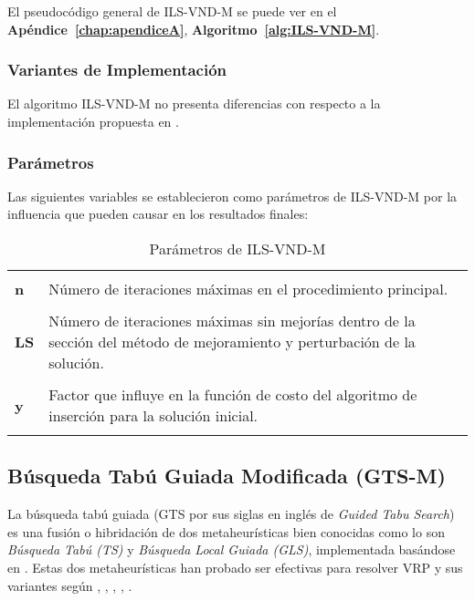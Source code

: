 El pseudocódigo general de ILS-VND-M se puede ver en el \textbf{Apéndice~\ref{chap:apendiceA}}, \textbf{Algoritmo~\ref{alg:ILS-VND-M}}.

\subsubsection*{Variantes de Implementación}

El algoritmo ILS-VND-M no presenta diferencias con respecto a la implementación propuesta en  \cite{ils-vnd}.

\subsubsection*{Parámetros}

Las siguientes variables se establecieron como parámetros de ILS-VND-M por la influencia que pueden causar en los resultados finales:


\begin{table}[ht]
\centering
\small
\caption{Parámetros de ILS-VND-M}
\begin{tabular}{l||p{15cm}}
\hline\hline\\
\textbf{n} & Número de iteraciones máximas en el procedimiento principal.\\ [0.7ex]\cline{2-2}\\
\textbf{LS} & Número de iteraciones máximas sin mejorías dentro de la sección del método de mejoramiento y perturbación de la solución. \\ 
[0.7ex]\cline{2-2}\\
\textbf{y} & Factor que influye en la función de costo del algoritmo de inserción para la solución inicial.\\
\\ \hline\hline
\end{tabular}
\label{table:param-ils}
\end{table}



\subsection{Búsqueda Tabú Guiada Modificada (GTS-M)} \label{sect:implementacion-gts}


La búsqueda tabú guiada (GTS por sus siglas en inglés de \emph{Guided Tabu Search}) es una fusión o hibridación de dos metaheurísticas bien conocidas como lo son \emph{Búsqueda Tabú (TS)} y \emph{Búsqueda Local Guiada (GLS)}, implementada basándose en \cite{gts}. Estas dos metaheurísticas han probado ser efectivas para resolver VRP y sus variantes según \cite{gts1}, \cite{gts2}, \cite{gts3}, \cite{gts4}, \cite{gts5}. 

